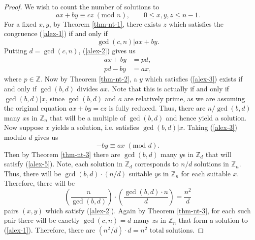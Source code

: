 \documentclass[10pt,a4paper]{amsart}
\newcommand{\Z}{\mathbb{Z}}
\renewcommand{\mod}[1]{\;(\text{mod }#1)}
\begin{document}
\begin{proof}
        We wish to count the number of solutions to
            \begin{equation}\label{alex-1}
                ax + by \equiv cz \mod{n}, \qquad 0 \leq x, y, z \leq n - 1.
            \end{equation}
        For a fixed $x, y$, by Theorem \ref{thm-nt-1}, there exists $z$ which satisfies the congruence (\ref{alex-1}) if and only if
            \begin{equation}\label{alex-2}
                \gcd(c,n) | ax + by.
            \end{equation}
        Putting $d = \gcd(c,n)$, (\ref{alex-2}) gives us
            \begin{equation}\label{alex-3}
                \begin{split}
                    ax + by &= pd,\\
                    pd - by &= ax,
                \end{split}
            \end{equation}
        where $p \in \Z$. Now by Theorem \ref{thm-nt-2}, a $y$ which satisfies (\ref{alex-3}) exists if and only if $\gcd(b,d)$ divides $ax$. Note that
        this is actually if and only if $\gcd(b,d) | x$, since $\gcd(b,d)$ and $a$ are relatively prime,
        as we are assuming the original equation $ax + by = cz$ is fully reduced. 
        Thus, there are $n /\gcd(b,d)$
        many $x$s in $\Z_n$ that will be a multiple of $\gcd(b,d)$ and hence yield a solution. 
        Now suppose $x$ yields a solution, i.e. satisfies $\gcd(b,d)|x$. Taking (\ref{alex-3}) modulo $d$ gives us
            \begin{equation}\label{alex-5}
                -by \equiv ax \mod{d}.
            \end{equation}
        Then by Theorem \ref{thm-nt-3} there are $\gcd(b,d)$ many $y$s in $\Z_d$ that will satisfy (\ref{alex-5}). Note, each solution in $\Z_d$ corresponds to $n/d$ solutions in $\Z_n$. Thus, there will be $\gcd(b,d) \cdot (n/d)$ suitable $y$s in $\Z_n$ for each suitable $x$. Therefore, there will be
            $$\left( \frac{n}{\gcd(b,d)} \right) \cdot \left( \frac{\gcd(b,d) \cdot n}{d} \right) = \frac{n^2}{d}$$
        pairs $(x,y)$ which satisfy (\ref{alex-2}). Again by Theorem \ref{thm-nt-3}, for each such pair there will be exactly $\gcd(c,n) = d$ many $z$s in $\Z_n$ that form a solution to (\ref{alex-1}). Therefore, there are
            $(n^2 / d) \cdot d = n^2$ total solutions.
\end{proof}
\end{document}
